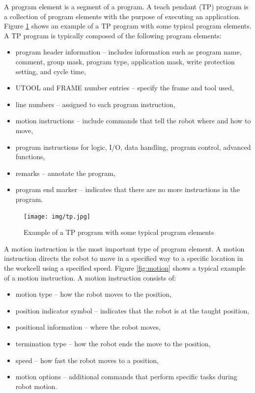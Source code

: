 A program element is a segment of a program. A teach pendant (TP) program is a collection of program elements with the purpose of executing an application.  Figure \ref{fig:tp} shows an example of a TP program with some typical program elements. A TP program is typically composed of the following program elements:

\begin{itemize}

\item program header information -- includes information such as program name, comment, group mask, program type, application mask, write protection setting, and cycle time, 
\item UTOOL and FRAME number entries -- specify the frame and tool used,
\item line numbers -- assigned to each program instruction,
\item motion instructions -- include commands that tell the robot where and how to move,
\item program instructions for logic, I/O, data handling, program control, advanced functions,
\item remarks -- annotate the program,
\item program end marker -- indicates that there are no more instructions in the program.

\end{itemize}

\begin{figure}[h]
    \centering
    \texttt{[image: img/tp.jpg]}
    \caption{Example of a TP program with some typical program elements \cite{fanuchandling}}
    \label{fig:tp}
\end{figure}

A motion instruction is the most important type of program element. A motion instruction directs the robot to move in a specified way to a specific location in the workcell using a specified speed. Figure \ref{fig:motion} shows a typical example of a motion instruction. A motion instruction consists of:

\begin{itemize}

\item motion type -- how the robot moves to the position,
\item position indicator symbol -- indicates that the robot is at the taught position,
\item positional information -- where the robot moves,
\item termination type -- how the robot ends the move to the position,
\item speed -- how fast the robot moves to a position,
\item motion options -- additional commands that perform specific tasks during robot motion.

\end{itemize}

